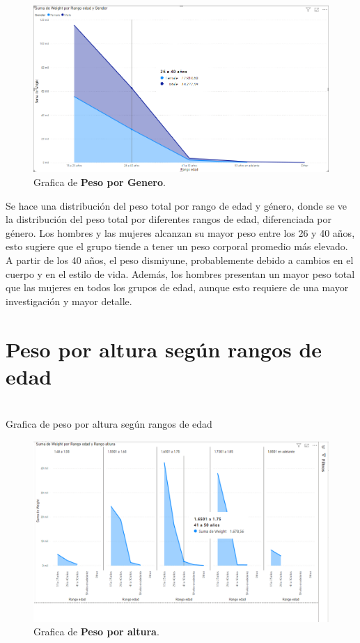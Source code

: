\documentclass[a4paper]{report} %
\begin{document}
              \begin{figure}[htb]
                \centering
                  \includegraphics[width=\textwidth]{Images/pesoporgenero.png}
                  \caption{Grafica de \textbf{Peso por Genero}.}
              \end{figure}
Se hace una distribución del peso total por rango de edad y género, donde se ve la distribución del peso total por diferentes rangos de edad, diferenciada por género. Los hombres y las mujeres alcanzan su mayor peso entre los 26 y 40 años, esto sugiere que el grupo tiende a tener un peso corporal promedio más elevado.\\A partir de los 40 años, el peso dismiyune, probablemente debido a cambios en el cuerpo y en el estilo de vida. Además, los hombres presentan un mayor peso total que las mujeres en todos los grupos de edad, aunque esto requiere de una mayor investigación y mayor detalle.
         \section{Peso por altura según rangos de edad}
            \paragraph{}\mbox{} \\
            Grafica de peso por altura según rangos de edad
            \begin{figure}[htb]
                \centering
                  \includegraphics[width=\textwidth]{Images/pesoporaltura.png}
                  \caption{Grafica de \textbf{Peso por altura}.}
              \end{figure}
\end{document}
